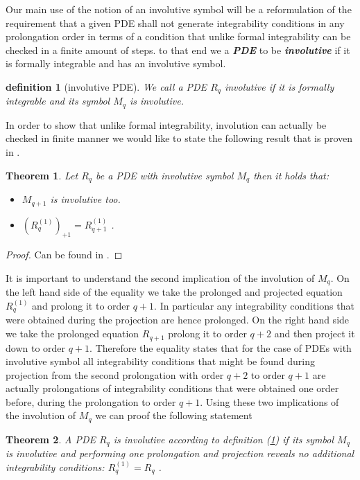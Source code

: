 \documentclass[a4paper,12pt, DIV=14, BCOR=5mm, twoside, headsepline]{scrbook}
\newtheorem{theorem}{Theorem}[section]
\newtheorem{definition}{definition}[section]
\begin{document}
Our main use of the notion of an involutive symbol will be a reformulation of the requirement that a given PDE shall not generate integrability conditions in any prolongation order in terms of a condition that unlike formal integrability can be checked in a finite amount of steps. to that end we a \textit{\textbf{PDE}} to be \textit{\textbf{involutive}} if it is formally integrable and has an involutive symbol.
\begin{definition}[involutive PDE] \label{invol}
We call a PDE $R_q$ involutive if it is formally integrable and its symbol $M_q$ is involutive.
\end{definition}
In order to show that unlike formal integrability, involution can actually be checked in finite manner we would like to state the following result that is proven in \cite{seiler1994analysis}.
\begin{theorem}\label{invoCons}
Let $R_q$ be a PDE with involutive symbol $M_q$ then it holds that:
\begin{itemize}
    \item $M_{q+1}$ is involutive too.
    \item $(R_{q}^{(1)})_{+1} = R_{q+1}^{(1)}$ .
\end{itemize}
\end{theorem}
\begin{proof}
Can be found in \cite{seiler1994analysis}.
\end{proof}
It is important to understand the second implication of the involution of $M_q$. On the left hand side of the equality we take the prolonged and projected equation $R_q^{(1)}$ and prolong it to order $q+1$. In particular any integrability conditions that were obtained during the projection are hence prolonged. On the right hand side we take the prolonged equation $R_{q+1}$ prolong it to order $q+2$ and then project it down to order $q+1$. Therefore the equality states that for the case of PDEs with involutive symbol all integrability conditions that might be found during projection from the second prolongation with order $q+2$ to order $q+1$ are actually prolongations of integrability conditions that were obtained one order before, during the prolongation to order $q+1$.
Using these two implications of the involution of $M_q$ we can proof the following statement
\begin{theorem}
A PDE $R_q$ is involutive according to definition (\ref{invol}) if its symbol $M_q$ is involutive and performing one prolongation and projection reveals no additional integrability conditions: $R_q^{(1)} = R_q$ .
\end{theorem}
\end{document}
